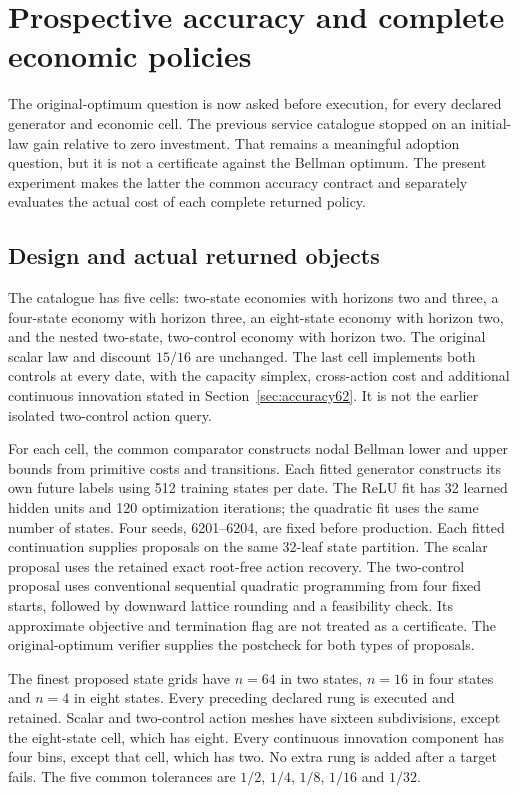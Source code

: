 \section{Prospective accuracy and complete economic policies}\label{sec:study62}
The original-optimum question is now asked before execution, for every declared generator and economic cell. The previous service catalogue stopped on an initial-law gain relative to zero investment. That remains a meaningful adoption question, but it is not a certificate against the Bellman optimum. The present experiment makes the latter the common accuracy contract and separately evaluates the actual cost of each complete returned policy.

\subsection{Design and actual returned objects}
The catalogue has five cells: two-state economies with horizons two and three, a four-state economy with horizon three, an eight-state economy with horizon two, and the nested two-state, two-control economy with horizon two. The original scalar law and discount $15/16$ are unchanged. The last cell implements both controls at every date, with the capacity simplex, cross-action cost and additional continuous innovation stated in Section~\ref{sec:accuracy62}. It is not the earlier isolated two-control action query.

For each cell, the common comparator constructs nodal Bellman lower and upper bounds from primitive costs and transitions. Each fitted generator constructs its own future labels using 512 training states per date. The ReLU fit has 32 learned hidden units and 120 optimization iterations; the quadratic fit uses the same number of states. Four seeds, 6201--6204, are fixed before production. Each fitted continuation supplies proposals on the same 32-leaf state partition. The scalar proposal uses the retained exact root-free action recovery. The two-control proposal uses conventional sequential quadratic programming from four fixed starts, followed by downward lattice rounding and a feasibility check. Its approximate objective and termination flag are not treated as a certificate. The original-optimum verifier supplies the postcheck for both types of proposals.

The finest proposed state grids have $n=64$ in two states, $n=16$ in four states and $n=4$ in eight states. Every preceding declared rung is executed and retained. Scalar and two-control action meshes have sixteen subdivisions, except the eight-state cell, which has eight. Every continuous innovation component has four bins, except that cell, which has two. No extra rung is added after a target fails. The five common tolerances are $1/2$, $1/4$, $1/8$, $1/16$ and $1/32$.

